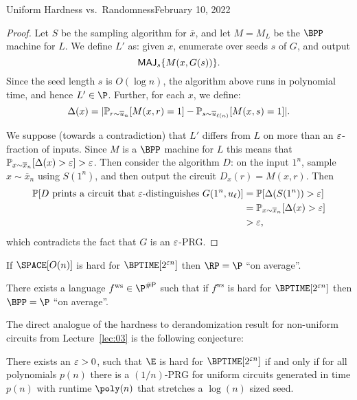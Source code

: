 \begin{lecture}{4}{Uniform Hardness vs.\ Randomness}{February 10, 2022}
\begin{proof}
	Let $S$ be the sampling algorithm for $\overline{x}$, and let $M = M_L$
	be the $\BPP$ machine for $L$. We define $L'$ as: given $x$, enumerate
	over seeds $s$ of $G$, and output
	\[ \textsf{MAJ}_{s} \{M(x, G(s)) \}. \]
	Since the seed length $s$ is $O(\log n)$, the algorithm above runs in
	polynomial time, and hence $L' \in \P$.
	Further, for each $x$, we define:
	\[
		\Delta(x) = \lvert
			\mathbb{P}_{r \sim \overline{u}_n}         [ M(x, r) = 1]
		  - \mathbb{P}_{s \sim \overline{u}_{\ell(n)}} [ M(x, s) = 1]
		  \rvert.
	\]

	We suppose (towards a contradiction) that $L'$ differs from $L$ on more
	than an $\varepsilon$-fraction of inputs. Since $M$ is a $\BPP$ machine for $L$
	this means that
	$\mathbb{P}_{x \sim \overline{x}_n}[\Delta(x) > \varepsilon] > \varepsilon$. Then consider
	the algorithm $D$: on the input $1^n$, sample $x \sim \overline{x}_n$ using
	$S(1^n)$, and then output the circuit $D_x(r) = M(x, r)$.
	Then
  \begin{align*}
		\mathbb{P}[D \text{ prints a circuit that } \varepsilon \text{-distinguishes } G(1^n, u_{\ell})]
    &= \mathbb{P}[\Delta(S(1^n)) > \varepsilon]\\
    &= \mathbb{P}_{x \sim \overline{x}_n}[\Delta(x) > \varepsilon]\\
    &> \varepsilon,
  \end{align*}
	which contradicts the fact that $G$ is an $\varepsilon$-PRG.
\end{proof}


\begin{theorem}
	If
	$\SPACE\brac{O(n)}$ is hard for $\BPTIME\brac{2^{\eps n}}$
	then
	$\RP = \P$ ``on average''.
\end{theorem}

\newcommand{\fws}{\ensuremath{ f^{\text{ws}} }}
\begin{theorem}
	There exists a language $\fws \in \P^{\sharpp}$ such that if $\fws$
	is hard for $\BPTIME\brac{2^{\eps n}}$ then
	$\BPP = \P$ ``on average''.
\end{theorem}

The direct analogue of the hardness to derandomization result for non-uniform
circuits from Lecture~\ref{lec:03} is the following conjecture:

\begin{conjecture}
	There exists an $\varepsilon > 0$, such that $\E$ is hard for
	$\BPTIME\brac{2^{\eps n}}$ if and only if for all polynomials $p(n)$ there
	is a $(1 / n)$-PRG for uniform circuits generated in time $p(n)$ with
	runtime $\poly(n)$ that stretches a $\log(n)$ sized seed.
\end{conjecture}


\end{lecture}
